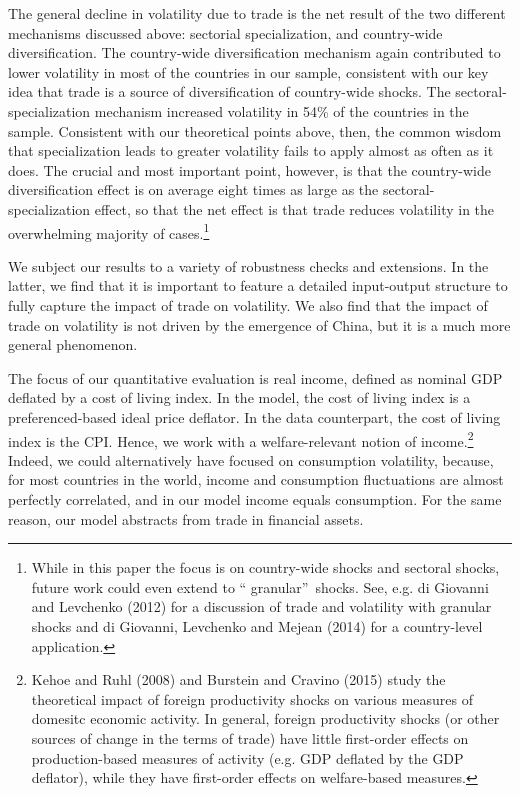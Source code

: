 \documentclass[12pt]{article}
\begin{document}
The general decline in volatility due to trade is the net result of the two
different mechanisms discussed above: sectorial specialization, and
country-wide diversification. The country-wide diversification mechanism
again contributed to lower volatility in most of the countries in our
sample, consistent with our key idea that trade is a source of
diversification of country-wide shocks. The sectoral-specialization
mechanism increased volatility in 54\% of the countries in the sample.
Consistent with our theoretical points above, then, the common wisdom that
specialization leads to greater volatility fails to apply almost as often as
it does. The crucial and most important point, however, is that the
country-wide diversification effect is on average eight times as large as
the sectoral-specialization effect, so that the net effect is that trade
reduces volatility in the overwhelming majority of cases.\footnote{%
While in this paper the focus is on country-wide shocks and sectoral shocks,
future work could even extend to \textquotedblleft
granular\textquotedblright\ shocks. See, e.g. di Giovanni and Levchenko
(2012) for a discussion of trade and volatility with granular shocks and di
Giovanni, Levchenko and Mejean (2014) for a country-level application.}

We subject our results to a variety of robustness checks and extensions. In
the latter, we find that it is important to feature a detailed input-output
structure to fully capture the impact of trade on volatility. We also find
that the impact of trade on volatility is not driven by the emergence of
China, but it is a much more general phenomenon.

The focus of our quantitative evaluation is real income, defined as nominal
GDP deflated by a cost of living index. In the model, the cost of living
index is a preferenced-based ideal price deflator. In the data counterpart,
the cost of living index is the CPI. Hence, we work with a welfare-relevant
notion of income.\footnote{%
Kehoe and Ruhl (2008) and Burstein and Cravino (2015) study the theoretical
impact of foreign productivity shocks on various measures of domesitc
economic activity. In general, foreign productivity shocks (or other sources
of change in the terms of trade) have little first-order effects on
production-based measures of activity (e.g. GDP deflated by the GDP
deflator), while they have first-order effects on welfare-based measures.}
Indeed, we could alternatively have focused on consumption volatility,
because, for most countries in the world, income and consumption
fluctuations are almost perfectly correlated, and in our model income equals
consumption. For the same reason, our model abstracts from trade in
financial assets.
\end{document}
